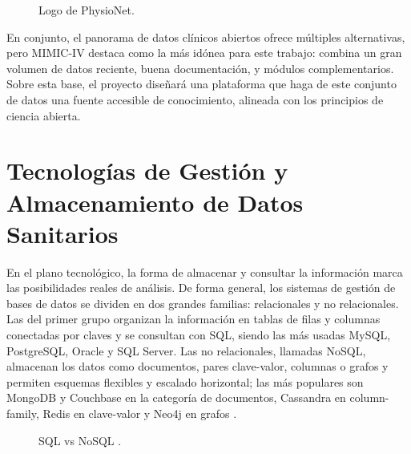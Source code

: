 \begin{figure}[ht]
    \centering
    \caption{Logo de PhysioNet.}
\end{figure}

\newpage
En conjunto, el panorama de datos clínicos abiertos ofrece múltiples alternativas, pero MIMIC-IV destaca como la más idónea para este trabajo: combina un gran volumen de datos reciente, buena documentación, y módulos complementarios. Sobre esta base, el proyecto diseñará una plataforma que haga de este conjunto de datos una fuente accesible de conocimiento, alineada con los principios de ciencia abierta.


\section{Tecnologías de Gestión y Almacenamiento de Datos Sanitarios}




En el plano tecnológico, la forma de almacenar y consultar la información marca las posibilidades reales de análisis. De forma general, los sistemas de gestión de bases de datos se dividen en dos grandes familias: relacionales y no relacionales. Las del primer grupo organizan la información en tablas de filas y columnas conectadas por claves y se consultan con SQL, siendo las más usadas MySQL, PostgreSQL, Oracle y SQL Server.  Las no relacionales, llamadas NoSQL, almacenan los datos como documentos, pares clave-valor, columnas o grafos y permiten esquemas flexibles y escalado horizontal; las más populares son MongoDB y Couchbase en la categoría de documentos, Cassandra en column-family, Redis en clave-valor y Neo4j en grafos \cite{DBEngines2025}.

\begin{figure}[H]
    \centering
    \caption{SQL vs NoSQL \cite{sqlvsnosqlfoto}.}
\end{figure}


